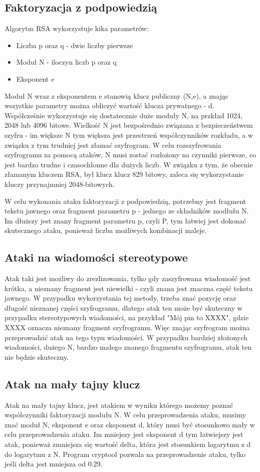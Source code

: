 \documentclass{article}
\begin{document}
\subsection{Faktoryzacja z podpowiedzią}
Algorytm RSA wykorzystuje kika parametrów:
\begin{itemize}
    \item Liczba p oraz q - dwie liczby pierwsze
    \item Moduł N - iloczyn liczb p oraz q
    \item Eksponent e
\end{itemize}
Moduł N wraz z eksponentem e stanowią klucz publiczny (N,e), a znając wszystkie parametry można obliczyć wartość klucza prywatnego - d. Współcześnie wykorzystuje się dostatecznie duże moduły N, na przkład 1024, 2048 lub 4096 bitowe.
Wielkość N jest bezpośrednio związana z bezpieczeństwem szyfru - im większe N tym większa jest przestrzeń współczynników rozkładu, a w związku z tym trudniej jest złamać szyfrogram.
W celu rozszyfrowania szyfrogramu za pomocą ataków, N musi zostać rozłożony na czynniki pierwsze, co jest bardzo trudne i czasochłonne dla dużych liczb.
W związku z tym, że obecnie złamanym kluczem RSA, był klucz klucz 829 bitowy, zaleca się wykorzystanie kluczy przynajmniej 2048-bitowych.

W celu wykonania ataku faktoryzacji z podpowiedzią, potrzebny jest fragment tekstu jawnego oraz fragment parametru p - jednego ze składników modłułu N. Im dłuższy jest znany fragment parametru p, czyli P, tym łatwiej
jest dokonać skutecznego ataku, ponieważ liczba możliwych kombinacji maleje.
\subsection{Ataki na wiadomości stereotypowe}
Atak taki jest możliwy do zrezlizowania, tylko gdy zaszyfrowana wiadomość jest krótka, a nieznany fragment jest niewielki - czyli znana jest znaczna część tekstu jawnego.
W przypadku wykorzystania tej metody, trzeba znać pozycję oraz długość nieznanej części szyfrogramu, dlatego atak ten może być skuteczny w przypadku stereotypowych wiadomości, na przykład "Mój pin to XXXX", gdzie XXXX oznacza nieznany fragment szyfrogramu.
Więc znając szyfrogram można przeprowadzić atak na tego typu wiadomości. W przypadku bardziej złożonych wiadomości, dużego N, bardzo małego znanego fragmentu szyfrogramu, atak ten nie będzie skuteczny.
\subsection{Atak na mały tajny klucz}
Atak na mały tajny klucz, jest atakiem w wyniku którego możemy poznać współczynniki faktoryzacji modułu N. W celu przeprowadzenia ataku, musimy znać moduł N, eksponent e oraz eksponent d, który musi być stosunkowo mały w celu przeprowadzenia ataku.
Im mniejszy jest eksponent d tym łatwiejszy jest atak, ponieważ zmniejsza się wartość delta, która jest stosunkiem logarytmu z d do logarytmu z N. Program cryptool pozwala na przeprowadzenie ataku, tylko jeśli delta jest mniejsza od 0.29.
\end{document}
